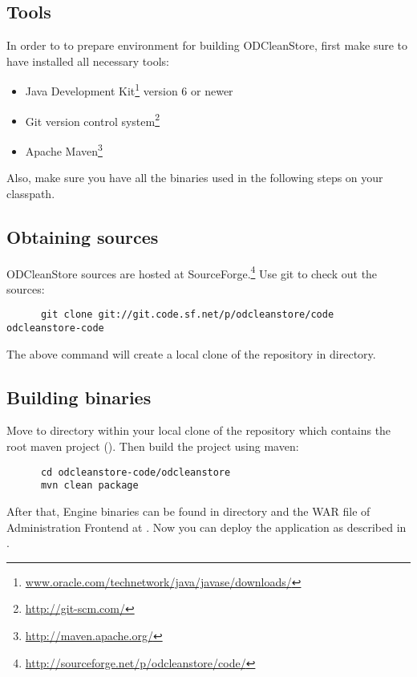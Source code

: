 \subsection{Tools}
	In order to to prepare environment for building ODCleanStore, first make sure to have installed all necessary tools:

\begin{itemize}
	\item Java Development Kit\footnote{\url{www.oracle.com/technetwork/java/javase/downloads/}} version 6\todo{} or newer
	\item Git version control system\footnote{\url{http://git-scm.com/}}
	\item Apache Maven\footnote{\url{http://maven.apache.org/}}
\end{itemize}

Also, make sure you have all the binaries used in the following steps on your classpath. 

\subsection{Obtaining sources} 
ODCleanStore sources are hosted at SourceForge.\footnote{\url{http://sourceforge.net/p/odcleanstore/code/}} Use git to check out the sources:

\begin{verbatim}
      git clone git://git.code.sf.net/p/odcleanstore/code odcleanstore-code
\end{verbatim}

The above command will create a local clone of the repository in  directory.

\subsection{Building binaries}
Move to directory  within your local clone of the repository which contains the root maven project (). Then build the project using maven:

\begin{verbatim}
      cd odcleanstore-code/odcleanstore
      mvn clean package
\end{verbatim}

After that, Engine binaries can be found in directory  and the WAR file of Administration Frontend at . Now you can deploy the application as described in . 

